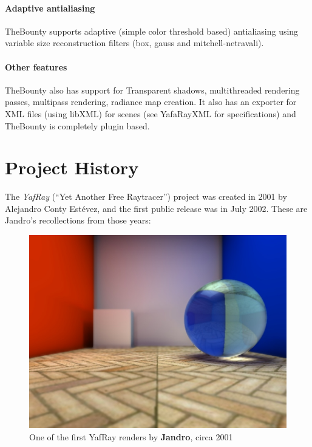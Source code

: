 \paragraph{Adaptive antialiasing} TheBounty supports adaptive (simple color threshold based) antialiasing using variable size reconstruction filters (box, gauss and mitchell-netravali).

\paragraph{Other features} TheBounty also has support for Transparent shadows, multithreaded rendering passes, multipass rendering, radiance map creation. It also has an exporter for XML files (using libXML) for scenes (see YafaRayXML for specifications) and TheBounty is completely plugin based.

\section*{Project History}
The \textit{YafRay} (``Yet Another Free Raytracer'') project was created in 2001 by Alejandro Conty Estévez, and the first public release was in July 2002. These are Jandro's recollections from those years:

\begin{figure}
    \centering
    \includegraphics[width=.9\textwidth]{images/caurad_test.jpg}
    \caption{One of the first YafRay renders by \textbf{Jandro}, circa 2001}
\end{figure}

